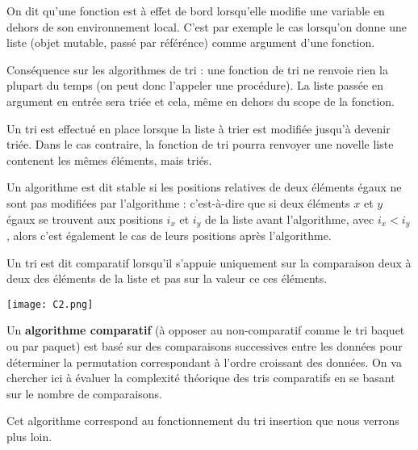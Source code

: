 \begin{defi} On dit qu'une fonction est à effet de bord lorsqu'elle modifie une variable  en dehors de son environnement local. C'est par exemple le cas lorsqu'on donne une liste (objet mutable, passé par référénce) comme argument d'une fonction.

Conséquence sur les algorithmes de tri : une fonction de tri ne renvoie rien la plupart du temps (on peut donc l'appeler une procédure). La liste passée en argument en entrée sera triée et cela, même en dehors du scope de la fonction. 
\end{defi}


\begin{defi}
Un tri est effectué en place lorsque la liste à trier est modifiée jusqu'à devenir triée. Dans le cas contraire, la fonction de tri pourra renvoyer une novelle liste contenent les mêmes éléments, mais triés. 
\end{defi}


\begin{defi}
Un algorithme est dit stable si les positions relatives de deux éléments égaux ne sont pas
modifiées par l'algorithme : c'est-à-dire que si deux éléments $x$ et $y$ égaux se trouvent aux positions $i_x$ et $i_y$ de
la liste avant l'algorithme, avec $i_x < i_y$, alors c'est également le cas de leurs positions après l'algorithme.
\end{defi}

\begin{defi}
Un tri est dit comparatif lorsqu'il s'appuie uniquement sur la comparaison deux à deux des éléments de la liste et pas sur la valeur ce ces éléments.
\end{defi}





\begin{marginfigure}
\texttt{[image: C2.png]}
\end{marginfigure}
\begin{exemple}%

Un \textbf{algorithme comparatif} (à opposer au non-comparatif comme le tri baquet ou par paquet) est basé sur des comparaisons successives entre les données pour déterminer la permutation correspondant à l'ordre croissant des données.
On va chercher ici à évaluer la complexité théorique des tris comparatifs en se basant sur le nombre de comparaisons.

Cet algorithme correspond au fonctionnement du tri insertion que nous verrons plus loin.

\end{exemple}

